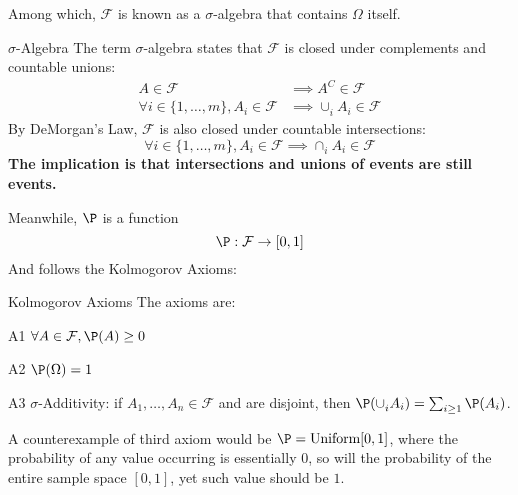 Among which, $\mathcal{F}$ is known as a $\sigma$-algebra that contains $\Omega$ itself. \\
\begin{ln-define}{$\sigma$-Algebra}{}
    The term $\sigma$-algebra states that $\mathcal{F}$ is closed under complements and countable unions:
    \begin{align*}
        A \in \mathcal{F} &\implies A^C \in \mathcal{F} \\
        \forall i \in \{1, \dots, m\}, A_i \in \mathcal{F} &\implies \cup_{i}^{} A_i \in \mathcal{F}
    \end{align*}
    By DeMorgan's Law, $\mathcal{F}$ is also closed under countable intersections:
    \[\forall i \in \{1, \dots, m\}, A_i \in \mathcal{F} \implies \cap_{i}^{} A_i \in \mathcal{F}\]
    \textbf{The implication is that intersections and unions of events are still events.}
\end{ln-define}
Meanwhile, $\P$ is a function
\[\P : \mathcal{F} \rightarrow [0, 1]\]
And follows the Kolmogorov Axioms:
\begin{ln-axiom}{Kolmogorov Axioms}{}
    The axioms are:
    \begin{bindenum}
        \item[A1] $\forall A \in \mathcal{F}, \P(A) \geq 0$
        \item[A2] $\P(\Omega) = 1$
        \item[A3] $\sigma$-Additivity: if $A_1, \dots, A_n \in \mathcal{F}$ and are disjoint, then $\P(\cup_{i}^{} A_i) = \sum_{i \geq 1}\P(A_i)$.
    \end{bindenum}
    A counterexample of third axiom would be $\P = \text{Uniform}[0, 1]$, where the probability of any value occurring is essentially $0$, so will the probability of the entire sample space $[0, 1]$, yet such value should be $1$.
\end{ln-axiom}

